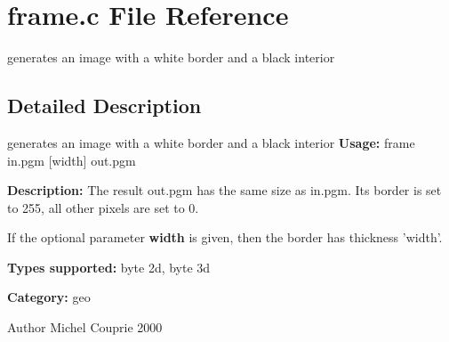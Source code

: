 \section{frame.c File Reference}
\label{frame_8c}


generates an image with a white border and a black interior  




\subsection{Detailed Description}
generates an image with a white border and a black interior {\bfseries Usage:} frame in.pgm [width] out.pgm

{\bfseries Description:} The result out.pgm has the same size as in.pgm. Its border is set to 255, all other pixels are set to 0.

If the optional parameter {\bfseries width} is given, then the border has thickness 'width'.

{\bfseries Types supported:} byte 2d, byte 3d

{\bfseries Category:} geo

\begin{DoxyAuthor}{Author}
Michel Couprie 2000 
\end{DoxyAuthor}
